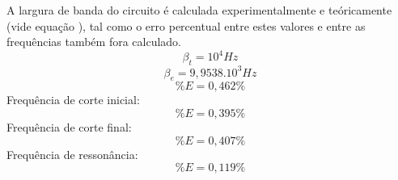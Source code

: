 A largura de banda do circuito é calculada experimentalmente e teóricamente (vide equação ), tal como o erro percentual entre estes valores e entre as frequências também fora calculado.
\begin{equation}
	\beta_{t} = 10^4 Hz
\end{equation}
\begin{equation}
	\beta_{e} = 9,9538.10^3 Hz
\end{equation}
\begin{equation}
	\%E = 0,462\%
\end{equation}
Frequência de corte inicial:
\begin{equation}
	\%E = 0,395\%
\end{equation}
Frequência de corte final:
\begin{equation}
	\%E = 0,407\%
\end{equation}
Frequência de ressonância:
\begin{equation}
	\%E = 0,119\%
\end{equation}

\pagebreak